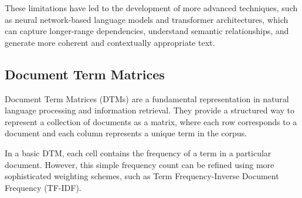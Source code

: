 \documentclass[a4paper, oneside]{discothesis}
\begin{document}

These limitations have led to the development of more advanced techniques, such as neural network-based language models and transformer architectures, which can capture longer-range dependencies, understand semantic relationships, and generate more coherent and contextually appropriate text.

\subsection{Document Term Matrices}
Document Term Matrices (DTMs) are a fundamental representation in natural language processing and information retrieval. They provide a structured way to represent a collection of documents as a matrix, where each row corresponds to a document and each column represents a unique term in the corpus.

In a basic DTM, each cell contains the frequency of a term in a particular document. 
However, this simple frequency count can be refined using more sophisticated weighting schemes, such as Term Frequency-Inverse Document Frequency (TF-IDF).
\end{document}
